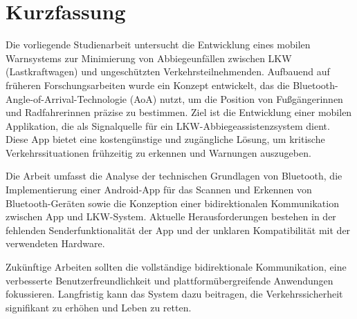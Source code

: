 \documentclass[a4paper, 12pt]{article} %
\begin{document}
\section*{Kurzfassung}
\begin{spacing}{1.8}  %
    \fontsize{14pt}{14pt}\selectfont  %
    Die vorliegende Studienarbeit untersucht die Entwicklung eines mobilen Warnsystems zur Minimierung von Abbiegeunfällen zwischen LKW (Lastkraftwagen) und ungeschützten Verkehrsteilnehmenden. Aufbauend auf früheren Forschungsarbeiten wurde ein Konzept entwickelt, das die
    Bluetooth-Angle-of-Arrival-Technologie (AoA) nutzt, um die Position 
    von Fußgängerinnen und Radfahrerinnen präzise zu bestimmen. Ziel ist
     die Entwicklung einer mobilen Applikation, die als Signalquelle für
      ein LKW-Abbiegeassistenzsystem dient. Diese App bietet eine 
      kostengünstige und zugängliche Lösung, um kritische 
      Verkehrssituationen frühzeitig zu erkennen und Warnungen auszugeben.

    Die Arbeit umfasst die Analyse der technischen Grundlagen 
    von Bluetooth, die Implementierung einer Android-App 
    für das Scannen 
    und Erkennen von Bluetooth-Geräten sowie die Konzeption 
    einer bidirektionalen Kommunikation zwischen App und LKW-System.
     Aktuelle Herausforderungen bestehen in der fehlenden 
     Senderfunktionalität der App und der unklaren Kompatibilität 
     mit der verwendeten Hardware.
    
    Zukünftige Arbeiten sollten die vollständige bidirektionale 
    Kommunikation, eine verbesserte Benutzerfreundlichkeit und
    plattformübergreifende Anwendungen fokussieren. Langfristig kann das System dazu beitragen, die Verkehrssicherheit signifikant zu erhöhen und Leben zu retten.

\end{spacing}
\end{document}
